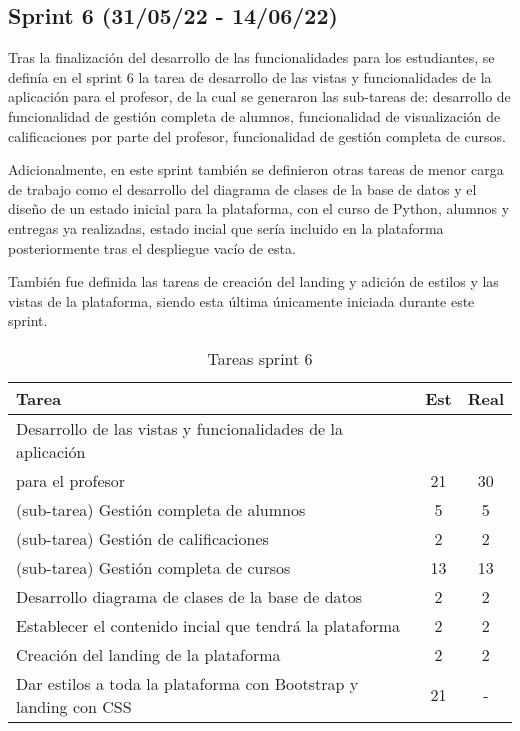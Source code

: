 \subsection{Sprint 6 (31/05/22 - 14/06/22)}
Tras la finalización del desarrollo de las funcionalidades para los estudiantes, se definía en el sprint 6 la tarea de desarrollo de las vistas y funcionalidades de la aplicación para el profesor, de la cual se generaron las sub-tareas de: desarrollo de funcionalidad de gestión completa de alumnos, funcionalidad de visualización de calificaciones por parte del profesor, funcionalidad de gestión completa de cursos.

Adicionalmente, en este sprint también se definieron otras tareas de menor carga de trabajo como el desarrollo del diagrama de clases de la base de datos y el diseño de un estado inicial para la plataforma, con el curso de Python, alumnos y entregas ya realizadas, estado incial que sería incluido en la plataforma posteriormente tras el despliegue vacío de esta.

También fue definida las tareas de creación del landing y adición de estilos y las vistas de la plataforma, siendo esta última únicamente iniciada durante este sprint.


\begin{table}[h]
\begin{center}
\begin{tabular}{| l | c | c |}
\textbf{Tarea}                   & \textbf{Est} & \textbf{Real} \\ \hline
Desarrollo de las vistas y funcionalidades de la aplicación & &\\
para el profesor & 21 & 30 \\
 (sub-tarea) Gestión completa de alumnos & 5 & 5 \\
 (sub-tarea) Gestión de calificaciones & 2 & 2 \\
 (sub-tarea) Gestión completa de cursos & 13 & 13 \\
Desarrollo diagrama de clases de la base de datos & 2 & 2 \\
Establecer el contenido incial que tendrá la plataforma & 2 & 2 \\
Creación del landing de la plataforma & 2 & 2\\
Dar estilos a toda la plataforma con Bootstrap y landing con CSS
 & 21 & - \\ \hline
\end{tabular}
\caption{Tareas sprint 6}
\label{tab:sprint}
\end{center}
\end{table}


